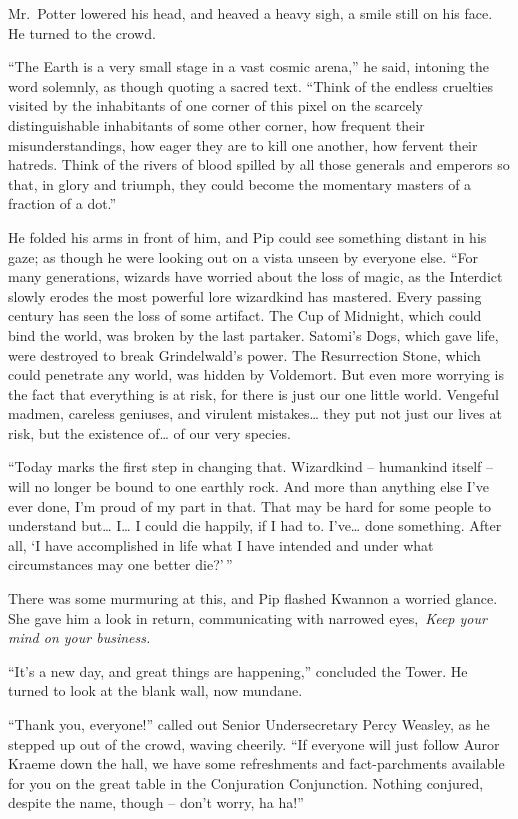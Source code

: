 Mr.~Potter lowered his head, and heaved a heavy sigh, a smile still on
his face. He turned to the crowd.

``The Earth is a very small stage in a vast cosmic arena,'' he said,
intoning the word solemnly, as though quoting a sacred text. ``Think of
the endless cruelties visited by the inhabitants of one corner of this
pixel on the scarcely distinguishable inhabitants of some other corner,
how frequent their misunderstandings, how eager they are to kill one
another, how fervent their hatreds. Think of the rivers of blood spilled
by all those generals and emperors so that, in glory and triumph, they
could become the momentary masters of a fraction of a dot.''

He folded his arms in front of him, and Pip could see something distant
in his gaze; as though he were looking out on a vista unseen by everyone
else. ``For many generations, wizards have worried about the loss of
magic, as the Interdict slowly erodes the most powerful lore wizardkind
has mastered. Every passing century has seen the loss of some artifact.
The Cup of Midnight, which could bind the world, was broken by the last
partaker. Satomi's Dogs, which gave life, were destroyed to break
Grindelwald's power. The Resurrection Stone, which could penetrate any
world, was hidden by Voldemort. But even more worrying is the fact that
everything is at risk, for there is just our one little world. Vengeful
madmen, careless geniuses, and virulent mistakes\ldots{} they put not
just our lives at risk, but the existence of\ldots{} of our very
species.

``Today marks the first step in changing that. Wizardkind -- humankind
itself -- will no longer be bound to one earthly rock. And more than
anything else I've ever done, I'm proud of my part in that. That may be
hard for some people to understand but\ldots{} I\ldots{} I could die
happily, if I had to. I've\ldots{} done something. After all, `I have
accomplished in life what I have intended and under what circumstances
may one better die?'\,''

There was some murmuring at this, and Pip flashed Kwannon a worried
glance. She gave him a look in return, communicating with narrowed
eyes,~\emph{Keep your mind on your business.}

``It's a new day, and great things are happening,'' concluded the Tower.
He turned to look at the blank wall, now mundane.

``Thank you, everyone!'' called out Senior Undersecretary Percy Weasley,
as he stepped up out of the crowd, waving cheerily. ``If everyone will
just follow Auror Kraeme down the hall, we have some refreshments and
fact-parchments available for you on the great table in the Conjuration
Conjunction. Nothing conjured, despite the name, though -- don't worry,
ha ha!''

